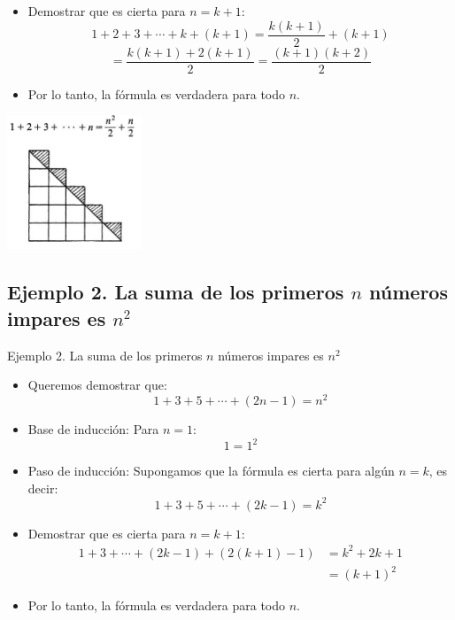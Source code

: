 \documentclass{beamer}
\begin{document}
\begin{frame}
    \begin{itemize}
        \item Demostrar que es cierta para \( n = k+1 \):
        \[ 1 + 2 + 3 + \cdots + k + (k+1) = \frac{k(k+1)}{2} + (k+1) \]
        \[ = \frac{k(k+1) + 2(k+1)}{2} = \frac{(k+1)(k+2)}{2} \]
        \item Por lo tanto, la fórmula es verdadera para todo \( n \).
    \end{itemize}
    \begin{center}
        \includegraphics[width=4cm]{images/sum-of-first-n-natural-numbers-proof-3.png}
    \end{center}
\end{frame}

\subsection{Ejemplo 2. La suma de los primeros \( n \) números impares es \( n^2 \)}
\begin{frame}{Ejemplo 2. La suma de los primeros \( n \) números impares es \( n^2 \)}
    \begin{itemize}
        \item Queremos demostrar que: \[ 1 + 3 + 5 + \cdots + (2n-1) = n^2 \]
        \item Base de inducción: Para \( n = 1 \):
        \[ 1 = 1^2 \]
        \item Paso de inducción: Supongamos que la fórmula es cierta para algún \( n = k \), es decir:
        \[ 1 + 3 + 5 + \cdots + (2k-1) = k^2 \]
    \end{itemize}
\end{frame}

\begin{frame}
    \begin{itemize}
        \item Demostrar que es cierta para \( n = k+1 \):
        \begin{align*} 1 + 3 + \cdots + (2k-1) + (2(k+1)-1) &= k^2 + 2k+1 \\&= (k+1)^2 \end{align*}
        \item Por lo tanto, la fórmula es verdadera para todo \( n \).
    \end{itemize}
\end{frame}
\end{document}
